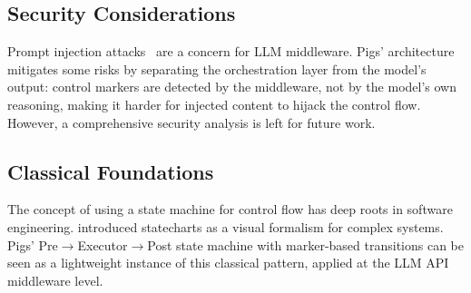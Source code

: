 \subsection{Security Considerations}

Prompt injection attacks~\citep{greshake2023promptinjection, liu2024promptinjection} are a concern for LLM middleware. Pigs' architecture mitigates some risks by separating the orchestration layer from the model's output: control markers are detected by the middleware, not by the model's own reasoning, making it harder for injected content to hijack the control flow. However, a comprehensive security analysis is left for future work.

\subsection{Classical Foundations}

The concept of using a state machine for control flow has deep roots in software engineering. \citet{harel1987statecharts} introduced statecharts as a visual formalism for complex systems. Pigs' Pre$\rightarrow$Executor$\rightarrow$Post state machine with marker-based transitions can be seen as a lightweight instance of this classical pattern, applied at the LLM API middleware level.
